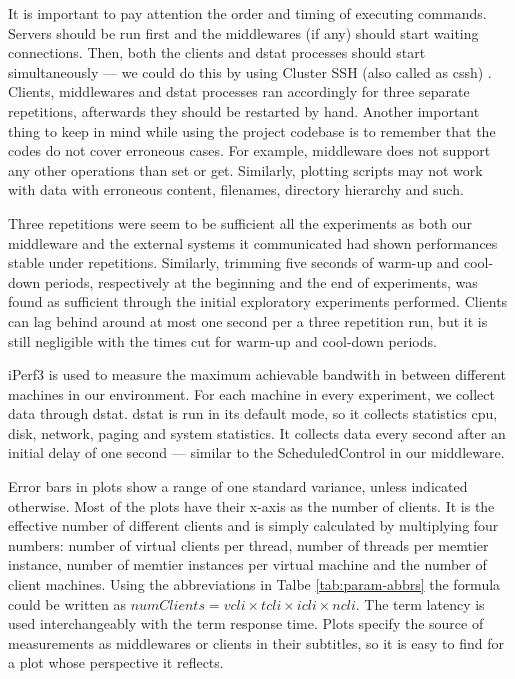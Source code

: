 \documentclass[11pt,a4paper]{article}
\begin{document}
\par It is important to pay attention the order and timing of executing commands. Servers should be run first and the middlewares (if any) should start waiting connections. Then, both the clients and dstat processes should start simultaneously — we could do this by using Cluster SSH (also called as cssh) \cite{cssh}. Clients, middlewares and dstat processes ran accordingly for three separate repetitions, afterwards they should be restarted by hand. Another important thing to keep in mind while using the project codebase is to remember that the codes do not cover erroneous cases. For example, middleware does not support any other operations than set or get. Similarly, plotting scripts may not work with data with erroneous content, filenames, directory hierarchy and such.
\\
\par Three repetitions were seem to be sufficient all the experiments as both our middleware and the external systems it communicated had shown performances stable under repetitions. Similarly, trimming five seconds of warm-up and cool-down periods, respectively at the beginning and the end of experiments, was found as sufficient through the initial exploratory experiments performed. Clients can lag behind around at most one second per a three repetition run, but it is still negligible with the times cut for warm-up and cool-down periods.
\par iPerf3 \cite{iperf} is used to measure the maximum achievable bandwith in between different machines in our environment. For each machine in every experiment, we collect data through dstat. dstat is run in its default mode, so it collects statistics cpu, disk, network, paging and system  statistics. It collects data every second after an initial delay of one second — similar to the ScheduledControl in our middleware.
\\
\par Error bars in plots show a range of one standard variance, unless indicated otherwise. Most of the plots have their x-axis as the number of clients. It is the effective number of different clients and is simply calculated by multiplying four numbers: number of virtual clients per thread, number of threads per memtier instance, number of memtier instances per virtual machine and the number of client machines. Using the abbreviations in Talbe \ref{tab:param-abbrs} the formula could be written as $numClients = vcli \times tcli \times icli \times ncli$. The term latency is used interchangeably with the term response time. Plots specify the source of measurements as middlewares or clients in their subtitles, so it is easy to find for a plot whose perspective it reflects.
\end{document}
